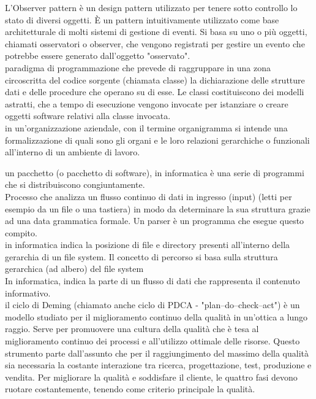 \documentclass{scalatekids-article}
\begin{document}

   L'Observer pattern è un design pattern utilizzato per tenere sotto controllo lo stato di diversi oggetti.
  È un pattern intuitivamente utilizzato come base architetturale di molti sistemi di gestione di eventi. 
  Si basa su uno o più oggetti, chiamati osservatori o observer, che vengono registrati per gestire un evento che potrebbe essere generato dall'oggetto "osservato".
  \\

   paradigma di programmazione che prevede di raggruppare in una zona circoscritta del codice sorgente (chiamata classe) la dichiarazione delle strutture dati e delle procedure che operano su di esse. Le classi costituiscono dei modelli astratti, che a tempo di esecuzione vengono invocate per istanziare o creare oggetti software relativi alla classe invocata.
  \\

   in un'organizzazione aziendale, con il termine organigramma si intende una formalizzazione di quali sono gli organi e le loro relazioni gerarchiche o funzionali all'interno di un ambiente di lavoro.
  \\


   un pacchetto (o pacchetto di software), in informatica è una serie di programmi che si distribuiscono congiuntamente.
  \\

   Processo che analizza un flusso continuo di dati in ingresso (input) (letti per esempio da un file o una tastiera) in modo da determinare la sua struttura grazie ad una data grammatica formale. Un parser è un programma che esegue questo compito.
  \\
  
   in informatica indica la posizione di file e directory presenti all'interno della gerarchia di un file system. Il concetto di percorso si basa sulla struttura gerarchica (ad albero) del file system
  \\

   In informatica, indica la parte di un flusso di dati che rappresenta il contenuto informativo.
  \\
  
   il ciclo di Deming (chiamato anche ciclo di PDCA - "plan–do–check–act") è un modello studiato per il miglioramento continuo della qualità in un'ottica a lungo raggio. Serve per promuovere una cultura della qualità che è tesa al miglioramento continuo dei processi e all'utilizzo ottimale delle risorse. Questo strumento parte dall'assunto che per il raggiungimento del massimo della qualità sia necessaria la costante interazione tra ricerca, progettazione, test, produzione e vendita. Per migliorare la qualità e soddisfare il cliente, le quattro fasi devono ruotare costantemente, tenendo come criterio principale la qualità.
  \\
\end{document}
